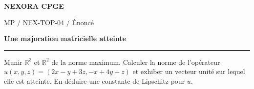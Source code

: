 \documentclass[11pt,a4paper]{article}
\begin{document}
{\small\bfseries\color{nexorablue} NEXORA CPGE}\par
{\small MP / NEX-TOP-04 / Énoncé}\par
{\LARGE\bfseries Une majoration matricielle atteinte}\par
\vspace{0.25em}\hrule\vspace{0.6em}

Munir $\mathbb R^3$ et $\mathbb R^2$ de la norme maximum. Calculer la norme de l’opérateur $u(x,y,z)=(2x-y+3z,-x+4y+z)$ et exhiber un vecteur unité sur lequel elle est atteinte. En déduire une constante de Lipschitz pour $u$.
\end{document}
